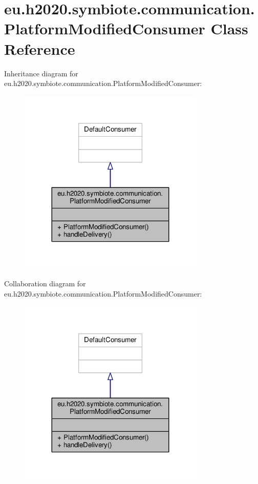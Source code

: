 \hypertarget{classeu_1_1h2020_1_1symbiote_1_1communication_1_1PlatformModifiedConsumer}{}\section{eu.\+h2020.\+symbiote.\+communication.\+Platform\+Modified\+Consumer Class Reference}
\label{classeu_1_1h2020_1_1symbiote_1_1communication_1_1PlatformModifiedConsumer}


Inheritance diagram for eu.\+h2020.\+symbiote.\+communication.\+Platform\+Modified\+Consumer\+:
\nopagebreak
\begin{figure}[H]
\begin{center}
\leavevmode
\includegraphics[width=251pt]{classeu_1_1h2020_1_1symbiote_1_1communication_1_1PlatformModifiedConsumer__inherit__graph}
\end{center}
\end{figure}


Collaboration diagram for eu.\+h2020.\+symbiote.\+communication.\+Platform\+Modified\+Consumer\+:
\nopagebreak
\begin{figure}[H]
\begin{center}
\leavevmode
\includegraphics[width=251pt]{classeu_1_1h2020_1_1symbiote_1_1communication_1_1PlatformModifiedConsumer__coll__graph}
\end{center}
\end{figure}
